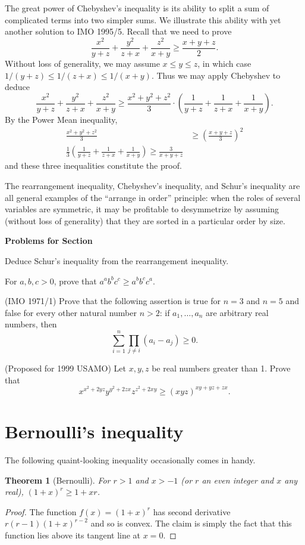 \documentclass[12pt]{report}
\newtheorem{theorem}{Theorem}
\def\ii{\item}
\newcounter{exc}
\numberwithin{exc}{section}
\newenvironment{exer}{\vspace{0.1in}
\noindent \textbf{Problems for Section~\thesection} \vspace{0.1in}
\begin{list}{\arabic{exc}.}{\usecounter{exc}}}{\end{list}}
\begin{document}
The great power of Chebyshev's inequality is its ability to split a 
sum of complicated terms into two simpler sums.
We illustrate this ability with yet another solution to IMO 
1995/5. Recall that we need to prove
\[
\frac{x^{2}}{y+z} + \frac{y^{2}}{z+x} + \frac{z^{2}}{x+y} \geq 
\frac{x+y+z}{2}.
\]
Without loss of generality, we may assume $x \leq y \leq z$, in which 
case $1/(y+z) \leq 1/(z+x) \leq 1/(x+y)$. Thus we may apply Chebyshev 
to deduce
\[
\frac{x^{2}}{y+z} + \frac{y^{2}}{z+x} + \frac{z^{2}}{x+y}
\geq \frac{x^{2}+y^{2}+z^{2}}{3} \cdot
\left( \frac{1}{y+z} + \frac{1}{z+x} + \frac{1}{x+y} \right).
\]
By the Power Mean inequality,
\begin{align*}
\frac{x^{2} + y^{2} + z^{2}}{3} &\geq \left(\frac{x + y + 
z}{3}\right)^{2} \\
\frac{1}{3} \left(\frac{1}{y+z} + \frac{1}{z+x} + 
\frac{1}{x+y}\right) \geq \frac{3}{x+y+z}
\end{align*}
and these three inequalities constitute the proof.

The rearrangement inequality, Chebyshev's inequality, and Schur's 
inequality are all general examples of the ``arrange in order'' 
principle: when the roles of several variables are symmetric, it may 
be profitable to desymmetrize by assuming (without loss of generality) 
that they are sorted in a particular order by size.

\begin{exer}
\ii
Deduce Schur's inequality from the rearrangement inequality.
\ii For $a,b,c >0$, prove that $a^a b^b c^c \geq a^b b^c c^a$.
\ii (IMO 1971/1)
Prove that the following assertion is true for $n=3$ and $n=5$ and 
false for every other natural number $n>2$: if $a_1, \dots, a_n$ are 
arbitrary real numbers, then
\[
\sum_{i=1}^n \prod_{j \neq i} (a_i - a_j) \geq 0.
\]
\ii
(Proposed for 1999 USAMO)
Let $x,y,z$ be real numbers greater than 1. Prove that
\[
x^{x^2+2yz} y^{y^2+2zx} z^{z^2+2xy} \geq (xyz)^{xy+yz+zx}.
\]
\end{exer}

\section{Bernoulli's inequality}
The following quaint-looking inequality occasionally comes in handy.
\begin{theorem}[Bernoulli]
For $r >1$ and $x > -1$ (or $r$ an even integer and $x$ any real),
$(1 + x)^{r} \geq 1 + xr$.
\end{theorem}
\begin{proof}
The function $f(x) = (1+x)^{r}$ has second derivative 
$r(r-1)(1+x)^{r-2}$ and so is convex. The claim is simply the fact 
that this function lies above its tangent line at $x=0$.
\end{proof}
\end{document}

